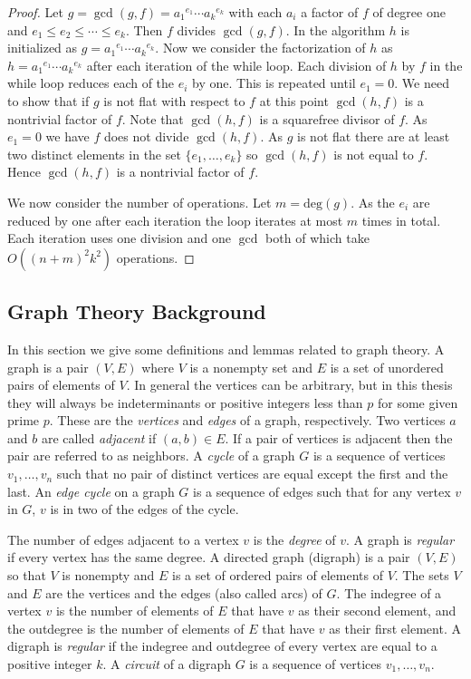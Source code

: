 \documentclass{article}
\theoremstyle{plain}
\theoremstyle{definition}
\def\deg {{ \mathrm{deg}}}
\begin{document}
		\begin{proof}
		    Let $g=\gcd(g,f)= {a_1}^{e_1} \cdots {a_k}^{e_k} $ with each $a_i$ a factor of $f$ of degree one and $e_1 \leq e_2 \leq \cdots \leq e_k$. Then $f$ divides $\gcd(g,f)$. In the algorithm $h$ is initialized as $g={a_1}^{e_1} \cdots {a_k}^{e_k}$. Now we consider the factorization of $h$ as $h={a_1}^{e_1} \cdots {a_k}^{e_k}$ after each iteration of the while loop. Each division of $h$ by $f$ in the while loop reduces each of the $e_i$ by one. This is repeated until $e_1=0$. We need to show that if $g$ is not flat with respect to $f$ at this point $\gcd(h,f)$ is a nontrivial factor of $f$. Note that $\gcd(h,f)$ is a squarefree divisor of $f$. As $e_1=0$ we have $f$ does not divide $\gcd(h,f)$. As $g$ is not flat there are at least two distinct elements in the set $\{ e_1,\ldots,e_k \}$ so $\gcd(h,f)$ is not equal to $f$. Hence $\gcd(h,f)$ is a nontrivial factor of $f$. 
				
				We now consider the number of operations. Let $m=\deg(g)$. As the $e_i$ are reduced by one after each iteration the loop iterates at most $m$ times in total. Each iteration uses one division and one $\gcd$ both of which take $O( (n+m)^2 k^2)$ operations.
		\end{proof} 
		
    \subsection{Graph Theory Background}
	  \label{SEC:GT}
						
			  In this section we give some definitions and lemmas related to graph theory. A graph is a pair $(V,E)$ where $V$ is a nonempty set and $E$ is a set of unordered pairs of elements of $V$. In general the vertices can be arbitrary, but in this thesis they will always be indeterminants or positive integers less than $p$ for some given prime $p$. These are the \emph{vertices} and \emph{edges} of a graph, respectively. Two vertices $a$ and $b$ are called \emph{adjacent} if $(a,b) \in E$. If a pair of vertices is adjacent then the pair are referred to as neighbors.  A \emph{cycle} of a graph $G$ is a sequence of vertices $v_1,\ldots, v_n$ such that no pair of distinct vertices are equal except the first and the last. An \emph{edge cycle} on a graph $G$ is a sequence of edges such that for any vertex $v$ in $G$, $v$ is in two of the edges of the cycle.  

        The number of edges adjacent to a vertex $v$ is the \emph{degree} of $v$. A graph is \emph{regular} if every vertex has the same degree. A directed graph (digraph) is a pair $(V,E)$ so that $V$ is nonempty and $E$ is a set of ordered pairs of elements of $V$. The sets $V$ and $E$ are the vertices and the edges (also called arcs) of $G$. The indegree of a vertex $v$ is the number of elements of $E$ that have $v$ as their second element, and the outdegree is the number of elements of $E$ that have $v$ as their first element. A digraph is \emph{regular} if the indegree and outdegree of every vertex are equal to a positive integer $k$. A \emph{circuit} of a digraph $G$ is a sequence of vertices $v_1,\ldots, v_n$.
				
\end{document}
